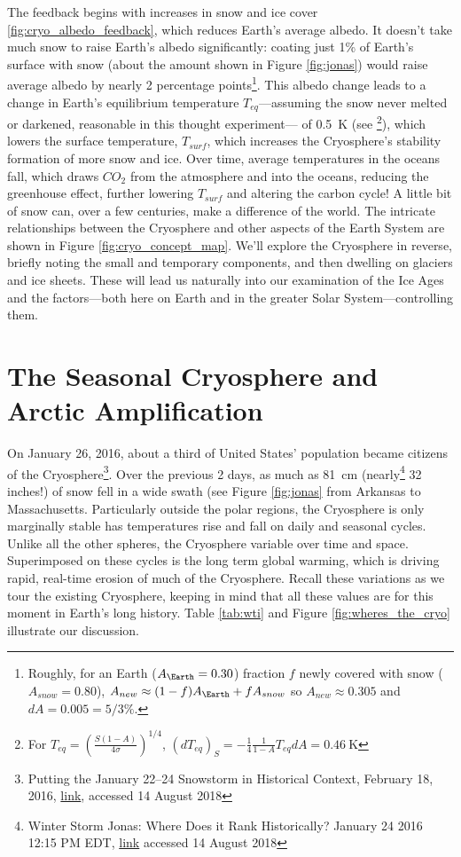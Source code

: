 \documentclass[amstex,12pt]{book}
\begin{document}
The feedback begins with increases in snow and ice cover \ref{fig:cryo_albedo_feedback}, which reduces Earth's average albedo. It doesn't take much snow to raise Earth's albedo significantly: coating just 1\% of Earth's surface with snow (about the amount shown in Figure \ref{fig:jonas}) would raise average albedo by nearly 2 percentage points\footnote{Roughly, for an Earth ($A_\Earth=0.30$) fraction $f$ newly covered with snow ($A_{snow}=0.80$), $A_{new} \approx (1-f)A_\Earth+fA_{snow}$ so $A_{new} \approx 0.305$ and $dA=0.005=5/3\%$.}. This albedo change leads to a change in Earth's equilibrium temperature $T_{eq}$---assuming the snow never melted or darkened, reasonable in this thought experiment--- of \SI{0.5}{K} (see \footnote{For $T_{eq}=\left(\frac{S(1-A)}{4\sigma}\right)^{1/4}$, $\left(dT_{eq}\right)_S=-\frac{1}{4}\frac{1}{1-A}T_{eq}dA=\SI{0.46}{\kelvin}$}), which lowers the surface temperature, $T_{surf}$, which increases the Cryosphere's stability formation of more snow and ice. Over time, average temperatures in the oceans fall, which draws $CO_2$ from the atmosphere and into the oceans, reducing the greenhouse effect, further lowering $T_{surf}$ and altering the carbon cycle! A little bit of snow can, over a few centuries, make a difference of the world. The intricate relationships between the Cryosphere and other aspects of the Earth System are shown in Figure \ref{fig:cryo_concept_map}. We'll explore the Cryosphere in reverse, briefly noting the small and temporary components, and then dwelling on glaciers and ice sheets. These will lead us naturally into our examination of the Ice Ages and the factors---both here on Earth and in the greater Solar System---controlling them. 

 

 
\section{The Seasonal Cryosphere and Arctic Amplification}  \label{Arctic Amplification}
On January 26, 2016, about a third of United States' population became citizens of the Cryosphere\footnote{Putting the January 22–24 Snowstorm in Historical Context, February 18, 2016, \href{https://www.ncdc.noaa.gov/news/january-22-24-2016-snowstorm-in-historical-context}{link}, accessed 14 August 2018}. Over the previous 2 days, as much as \SI{81}{\centi\metre} (nearly\footnote{Winter Storm Jonas: Where Does it Rank Historically? January 24 2016 12:15 PM EDT, \href{https://weather.com/storms/winter/news/winter-storm-jonas-rank-in-history}{link} accessed 14 August 2018} 32 inches!) of snow fell in a wide swath (see Figure \ref{fig:jonas} from Arkansas to Massachusetts. Particularly outside the polar regions, the Cryosphere is only marginally stable has temperatures rise and fall on daily and seasonal cycles. Unlike all the other spheres, the Cryosphere variable over time and space. Superimposed on these cycles is the long term global warming, which is driving rapid, real-time erosion of much of the Cryosphere. Recall these variations as we tour the existing Cryosphere, keeping in mind that all these values are for this moment in Earth's long history. Table \ref{tab:wti} and Figure \ref{fig:wheres_the_cryo} illustrate our discussion.
\end{document}
